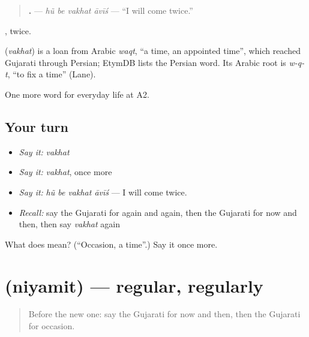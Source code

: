 \begin{quote}
\textbf{   .} — \emph{hũ be vakhat āvīś} — \textquotedblleft{}I will come twice.\textquotedblright{}
\end{quote}

\textbf{ }, twice.

\begin{cousinweb}
\textbf{} (\emph{vakhat}) is a loan from Arabic \emph{waqt}, \textquotedblleft{}a time, an appointed time\textquotedblright{}, which reached Gujarati through Persian; EtymDB lists the Persian word. Its Arabic root is \emph{w-q-t}, \textquotedblleft{}to fix a time\textquotedblright{} (Lane).
\end{cousinweb}

\begin{grammarlens}[title={What you've built}]
One more word for everyday life at A2.
\end{grammarlens}

\subsection*{Your turn}
\begin{itemize}
\raggedright
  \item \emph{Say it:} \emph{vakhat}
  \item \emph{Say it:} \emph{vakhat}, once more
  \item \emph{Say it:} \emph{hũ be vakhat āvīś} — I will come twice.
  \item \emph{Recall:} say the Gujarati for again and again, then the Gujarati for now and then, then say \emph{vakhat} again
\end{itemize}

\begin{tcolorbox}[breakable,colback=teal!4,colframe=teal!35!black,title={Before you move on}]
What does  mean? (\textquotedblleft{}Occasion, a time\textquotedblright{}.) Say it once more.
\end{tcolorbox}
\section[\texorpdfstring{\gu{નિયમિત} (niyamit)}{નિયમિત (niyamit)}]{ (niyamit) — regular, regularly}

\label{lesson:GU-C177-niyamit}



\begin{quote}
Before the new one: say the Gujarati for now and then, then the Gujarati for occasion.
\end{quote}

